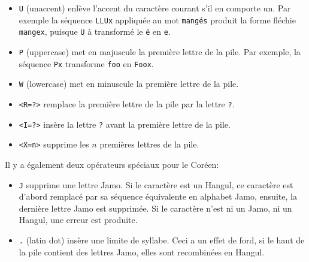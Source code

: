\begin{itemize}
\item \verb+U+ (unaccent)
          enlève l'accent du caractère courant s'il en comporte un.
	Par exemple la séquence \verb+LLUx+ appliquée au mot
	\texttt{mangés} produit la forme fléchie \verb+mangex+, puisque \verb+U+
	à transformé le \texttt{é} en \verb+e+.

\item \verb+P+ (uppercase)
          met en majuscule la première lettre de la pile. Par exemple, la séquence
	\verb$Px$ transforme \verb$foo$ en \verb$Foox$.
  
\item \verb+W+ (lowercase)
          met en minuscule la première lettre de la pile.

\item \verb+<R=?>+ 
          remplace la première lettre de la pile par la lettre \verb+?+.

\item \verb+<I=?>+ 
          insère la lettre \verb+?+ avant la première lettre de la pile.

\item \verb+<X=n>+ 
          supprime les $n$ premières lettres de la pile.
\end{itemize}

\noindent Il y a également deux opérateurs spéciaux pour le  Coréen:
\begin{itemize}
\item \verb+J+ 
supprime une lettre Jamo. Si le caractère est un Hangul, ce caractère est d'abord
remplacé par sa séquence équivalente en alphabet Jamo, ensuite, la dernière lettre Jamo est
supprimée. Si le caractère n'est ni un Jamo, ni un Hangul, une erreur est produite.
\item \verb+.+ (latin dot)
           insère une limite de syllabe. Ceci a un effet de ford, si le haut de la
	pile contient des lettres Jamo, elles sont recombinées en Hangul.
\end{itemize}


